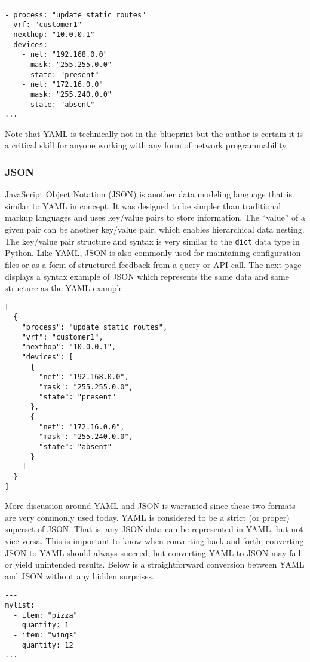 \begin{verbatim}
---
- process: "update static routes"
  vrf: "customer1"
  nexthop: "10.0.0.1"
  devices:
    - net: "192.168.0.0"
      mask: "255.255.0.0"
      state: "present"
    - net: "172.16.0.0"
      mask: "255.240.0.0"
      state: "absent"
...
\end{verbatim}

Note that YAML is technically not in the blueprint but the author is certain
it is a critical skill for anyone working with any form of network programmability.

\subsubsection{JSON}
JavaScript Object Notation (JSON) is another data modeling language that is
similar to YAML in concept. It was designed to be simpler than traditional
markup languages and uses key/value pairs to store information. The ``value'' of
a given pair can be another key/value pair, which enables hierarchical data
nesting. The key/value pair structure and syntax is very similar to the
\verb|dict| data type in Python. Like YAML, JSON is also
commonly used for maintaining configuration files or as a form of structured
feedback from a query or API call. The next page displays a
syntax example of JSON which represents the same data and same structure as
the YAML example.

\begin{verbatim}
[
  {
    "process": "update static routes",
    "vrf": "customer1",
    "nexthop": "10.0.0.1",
    "devices": [
      {
        "net": "192.168.0.0",
        "mask": "255.255.0.0",
        "state": "present"
      },
      {
        "net": "172.16.0.0",
        "mask": "255.240.0.0",
        "state": "absent"
      }
    ]
  }
]
\end{verbatim}

More discussion around YAML and JSON is warranted since these two formats are
very commonly used today. YAML is considered to be a strict (or proper)
superset of JSON\@. That is, any JSON data can be represented in YAML, but not
vice versa. This is important to know when converting back and forth;
converting JSON to YAML should always succeed, but converting YAML to JSON may
fail or yield unintended results. Below is a straightforward conversion
between YAML and JSON without any hidden surprises.

\begin{verbatim}
---
mylist:
  - item: "pizza"
    quantity: 1
  - item: "wings"
    quantity: 12
...
\end{verbatim}

